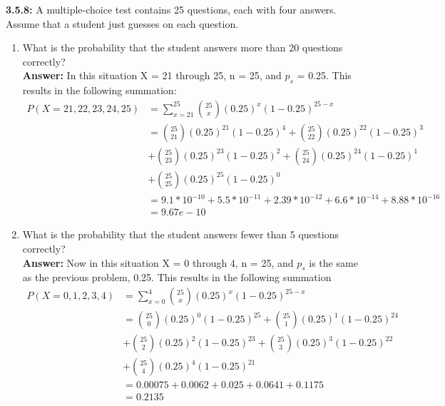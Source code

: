 \documentclass[11pt]{article}
\begin{document}
\noindent\textbf{3.5.8:} A multiple-choice test contains 25 questions, each with four answers. Assume that a student just guesses on each question.
\begin{enumerate}
\item What is the probability that the student answers more than 20 questions correctly?
\\\textbf{Answer: } In this situation X = 21 through 25, n = 25, and $p_s$ = 0.25. This results in the following summation:
\begin{equation}
\begin{split}
P(X = {21,22,23,24,25}) &=\sum_{x=21}^{25}  \binom {25}{x} (0.25)^x(1-0.25)^{25 - x} \\
& = \binom {25}{21} (0.25)^{21}(1-0.25)^{4} + \binom {25}{22} (0.25)^{22}(1-0.25)^{3} \\
&+\binom {25}{23} (0.25)^{23}(1-0.25)^{2} + \binom {25}{24} (0.25)^{24}(1-0.25)^{1} \\
&+ \binom {25}{25} (0.25)^{25}(1-0.25)^{0} \\
&= 9.1*10^{-10} + 5.5*10^{-11} + 2.39*10^{-12} + 6.6*10^{-14} + 8.88*10^{-16} \\
&= 9.67e-10
\end{split}
\end{equation}
\item What is the probability that the student answers fewer than 5 questions correctly?
\\\textbf{Answer: } Now in this situation X = 0 through 4, n = 25, and $p_s$ is the same as the previous problem, 0.25. This results in the following summation
\begin{equation}
\begin{split}
P(X = {0,1,2,3,4}) &=\sum_{x=0}^{4}  \binom {25}{x} (0.25)^x(1-0.25)^{25 - x} \\
& = \binom {25}{0} (0.25)^{0}(1-0.25)^{25} + \binom {25}{1} (0.25)^{1}(1-0.25)^{24} \\
&+ \binom {25}{2} (0.25)^{2}(1-0.25)^{23} + \binom {25}{3} (0.25)^{3}(1-0.25)^{22} \\
&+ \binom {25}{4} (0.25)^{4}(1-0.25)^{21} \\
&= 0.00075 + 0.0062 + 0.025 + 0.0641 + 0.1175\\
&= 0.2135
\end{split}
\end{equation}
\end{enumerate}
\end{document}
